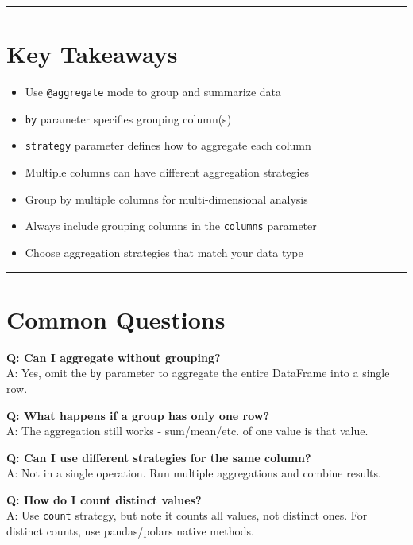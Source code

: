 \documentclass[
  letterpaper,
]{scrbook}
\providecommand{\tightlist}{%
  \setlength{\itemsep}{0pt}\setlength{\parskip}{0pt}}
\begin{document}
\begin{center}\rule{0.5\linewidth}{0.5pt}\end{center}

\section{Key Takeaways}\label{key-takeaways-7}

\begin{itemize}
\tightlist
\item
  Use \texttt{@aggregate} mode to group and summarize data
\item
  \texttt{by} parameter specifies grouping column(s)
\item
  \texttt{strategy} parameter defines how to aggregate each column
\item
  Multiple columns can have different aggregation strategies
\item
  Group by multiple columns for multi-dimensional analysis
\item
  Always include grouping columns in the \texttt{columns} parameter
\item
  Choose aggregation strategies that match your data type
\end{itemize}

\begin{center}\rule{0.5\linewidth}{0.5pt}\end{center}

\section{Common Questions}\label{common-questions-7}

\textbf{Q: Can I aggregate without grouping?}\\
A: Yes, omit the \texttt{by} parameter to aggregate the entire DataFrame
into a single row.

\textbf{Q: What happens if a group has only one row?}\\
A: The aggregation still works - sum/mean/etc. of one value is that
value.

\textbf{Q: Can I use different strategies for the same column?}\\
A: Not in a single operation. Run multiple aggregations and combine
results.

\textbf{Q: How do I count distinct values?}\\
A: Use \texttt{\textquotesingle{}count\textquotesingle{}} strategy, but
note it counts all values, not distinct ones. For distinct counts, use
pandas/polars native methods.
\end{document}

